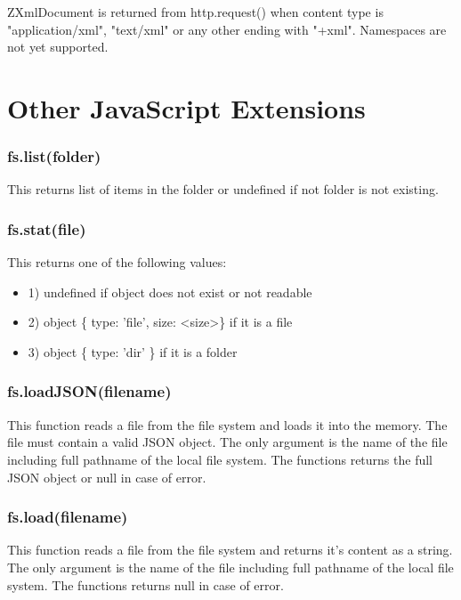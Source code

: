 ZXmlDocument is returned from http.request() when content type is "application/xml", "text/xml" or any other ending with "+xml". Namespaces are not yet supported.

\section{Other JavaScript Extensions}

\subsubsection{fs.list(folder)}

This returns list of items in the folder or undefined if not folder is not existing.


\subsubsection{fs.stat(file)}

This returns one of the following values:

\begin{itemize}
\item 1) undefined if object does not exist or not readable
\item 2) object \{ type: 'file', size: \textless{}size\textgreater{}\} if it is a file
\item 3) object \{ type: 'dir' \} if it is a folder
\end{itemize} 


\subsubsection{fs.loadJSON(filename)}

This function reads a file from the file system and loads it into the memory. The file must contain a valid JSON object. The only argument is the name of the file including full pathname of the local file system. The functions returns the full JSON object or null in case of error.

\subsubsection{fs.load(filename)}

This function reads a file from the file system and returns it's content as a string. The only argument is the name of the file including full pathname of the local file system. The functions returns null in case of error.


